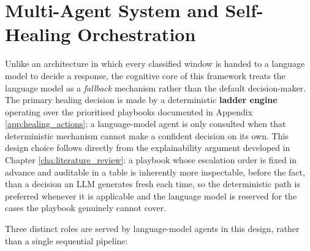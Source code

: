 \section{Multi-Agent System and Self-Healing Orchestration}\label{sec:multi_agent}

Unlike an architecture in which every classified window is handed to a language model to decide a response, the cognitive core of this framework treats the language model as a \textit{fallback} mechanism rather than the default decision-maker. The primary healing decision is made by a deterministic \textbf{ladder engine} operating over the prioritised playbooks documented in Appendix \ref{app:healing_actions}; a language-model agent is only consulted when that deterministic mechanism cannot make a confident decision on its own. This design choice follows directly from the explainability argument developed in Chapter \ref{cha:literature_review}: a playbook whose escalation order is fixed in advance and auditable in a table is inherently more inspectable, before the fact, than a decision an LLM generates fresh each time, so the deterministic path is preferred whenever it is applicable and the language model is reserved for the cases the playbook genuinely cannot cover.

Three distinct roles are served by language-model agents in this design, rather than a single sequential pipeline:

